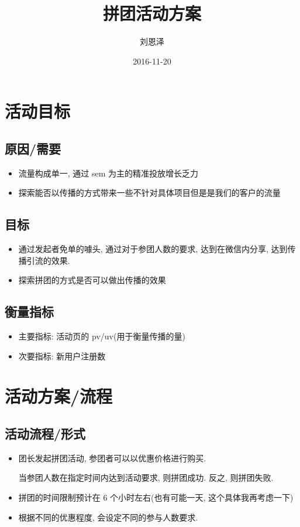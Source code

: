 \documentclass[11pt,a4paper]{article}
\author{刘恩泽}
\date{2016-11-20}
\title{拼团活动方案}
\begin{document}
\maketitle
\tableofcontents


\section{活动目标}
\label{sec:orgccf4ee7}
\subsection{原因/需要}
\label{sec:orgc51a026}
\begin{itemize}
\item 流量构成单一, 通过 sem 为主的精准投放增长乏力
\item 探索能否以传播的方式带来一些不针对具体项目但是是我们的客户的流量
\end{itemize}
\subsection{目标}
\label{sec:orgb05d3ab}
\begin{itemize}
\item 通过发起者免单的噱头, 通过对于参团人数的要求, 达到在微信内分享, 达到传播引流的效果.
\item 探索拼团的方式是否可以做出传播的效果
\end{itemize}
\subsection{衡量指标}
\label{sec:org8bb1897}
\begin{itemize}
\item 主要指标: 活动页的 pv/uv(用于衡量传播的量)
\item 次要指标: 新用户注册数
\end{itemize}

\section{活动方案/流程}
\label{sec:orgb3efc6f}
\subsection{活动流程/形式}
\label{sec:org798c292}

\begin{itemize}
\item 团长发起拼团活动, 参团者可以以优惠价格进行购买.

当参团人数在指定时间内达到活动要求, 则拼团成功. 反之, 则拼团失败.

\item 拼团的时间限制预计在 6 个小时左右(也有可能一天, 这个具体我再考虑一下)

\item 根据不同的优惠程度, 会设定不同的参与人数要求.
\end{itemize}
\end{document}

